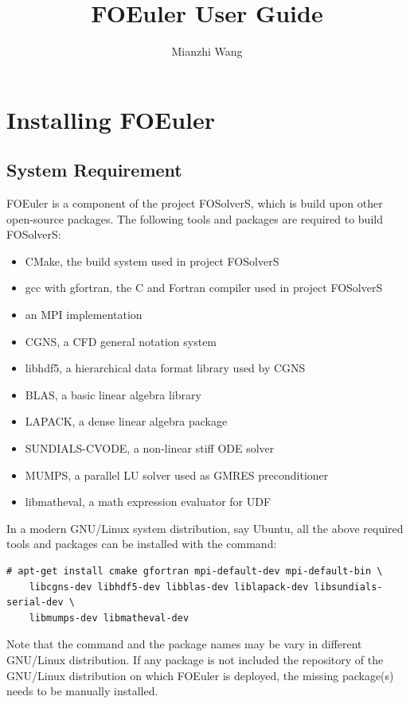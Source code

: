 \documentclass[]{article}
\title{FOEuler User Guide}
\author{Mianzhi Wang}
\begin{document}
\maketitle

\tableofcontents

\section{Installing FOEuler}

\subsection{System Requirement}
\label{sec:requirement}

FOEuler is a component of the project FOSolverS, which is build upon other open-source packages.
The following tools and packages are required to build FOSolverS:
\begin{itemize}
  \item CMake, the build system used in project FOSolverS
  \item gcc with gfortran, the C and Fortran compiler used in project FOSolverS
  \item an MPI implementation
  \item CGNS, a CFD general notation system
  \item libhdf5, a hierarchical data format library used by CGNS
  \item BLAS, a basic linear algebra library
  \item LAPACK, a dense linear algebra package
  \item SUNDIALS-CVODE, a non-linear stiff ODE solver
  \item MUMPS, a parallel LU solver used as GMRES preconditioner
  \item libmatheval, a math expression evaluator for UDF
\end{itemize}
In a modern GNU/Linux system distribution, say Ubuntu, all the above required tools and packages can
be installed with the command:
\begin{lstlisting}[backgroundcolor=\color{lightgray}]
  # apt-get install cmake gfortran mpi-default-dev mpi-default-bin \
    libcgns-dev libhdf5-dev libblas-dev liblapack-dev libsundials-serial-dev \
    libmumps-dev libmatheval-dev
\end{lstlisting}
Note that the command and the package names may be vary in different GNU/Linux distribution.
If any package is not included the repository of the GNU/Linux distribution on which FOEuler is
deployed, the missing package(s) needs to be manually installed.
\end{document}
